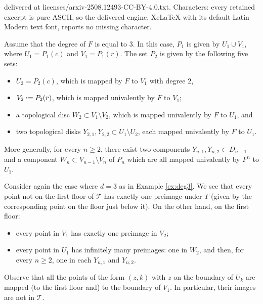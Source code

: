 \documentclass[10pt,a4paper]{amsart}
\newcommand*{\defeq}{\mathrel{\vcenter{\baselineskip0.5ex \lineskiplimit0pt
			\hbox{\scriptsize.}\hbox{\scriptsize.}}}%
	=}
\begin{document}
delivered at licenses/arxiv-2508.12493-CC-BY-4.0.txt. Characters: every retained excerpt is pure ASCII, so the delivered engine, XeLaTeX with its default Latin Modern text font, reports no missing character.
\begin{example}\label{ex:deg3}
Assume that the degree of $F$ is 
equal to $3$. In this case, $P_1$ is given by $U_1\cup V_1$,
where
$U_1 = P_1 (c)$
and
$V_1=P_1(r)$. The set $P_2$ is given by the following five sets: 
\begin{itemize}
    \item  $U_2=P_2(c)$, which is mapped by $F$ to $V_1$ with degree $2$, 
    \item $V_2 \defeq P_2 (r)$,
    which is mapped univalently by $F$ to $V_1$;
    \item a topological disc $W_2\subset V_1\setminus V_2$, which is mapped univalently by $F$ to $U_1$, and
    \item two topological disks $Y_{2,1}, Y_{2,2}
    \subset U_1\setminus U_2$, each mapped univalently
    by $F$ to $U_1$.
\end{itemize}
More generally,
for every $n\geq 2$, there exist
two components $Y_{n,1}, Y_{n,2}\subset D_{n-1}$
and a component $W_n\subset V_{n-1}\setminus V_{n}$ of $P_n$
which are all
mapped 
univalently
by $F^n$ to $U_1$. 
\end{example}

\begin{example}\label{ex:deg3-preim}
Consider again the case where $d=3$ as in Example \ref{ex:deg3}. We see that every point not on the first floor of $\mathcal T$ 
has exactly one preimage under $T$ 
(given by the corresponding point on the floor just below it). On the other hand, on the first floor:
\begin{itemize}
\item every point in $V_1$ has exactly one preimage in $V_2$;
\item every point in $U_1$ has infinitely many preimages: one in $W_2$, and then, for every $n\geq 2$, one in each $Y_{n,1}$ and $Y_{n,2}$.
\end{itemize}

\begin{rmk}\label{rmk_bdryUk}
Observe that all the points of the form $(z,k)$ with $z$ on the 
boundary
of $U_k$ are mapped
(to the first floor and) to the boundary of $V_1$. In particular, their images are not in $\mathcal T$.
\end{rmk}

\end{example}
\end{document}
